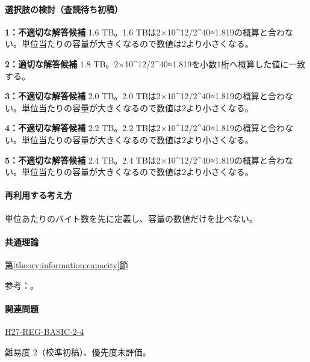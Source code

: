 \paragraph{選択肢の検討（査読待ち初稿）}\mbox{}\par

\noindent\textbf{1：不適切な解答候補} 1.6 TB。1.6 TBは2×10\textasciicircum{}12/2\textasciicircum{}40≈1.819の概算と合わない。単位当たりの容量が大きくなるので数値は2より小さくなる。\par

\noindent\textbf{2：適切な解答候補} 1.8 TB。2×10\textasciicircum{}12/2\textasciicircum{}40≈1.819を小数1桁へ概算した値に一致する。\par

\noindent\textbf{3：不適切な解答候補} 2.0 TB。2.0 TBは2×10\textasciicircum{}12/2\textasciicircum{}40≈1.819の概算と合わない。単位当たりの容量が大きくなるので数値は2より小さくなる。\par

\noindent\textbf{4：不適切な解答候補} 2.2 TB。2.2 TBは2×10\textasciicircum{}12/2\textasciicircum{}40≈1.819の概算と合わない。単位当たりの容量が大きくなるので数値は2より小さくなる。\par

\noindent\textbf{5：不適切な解答候補} 2.4 TB。2.4 TBは2×10\textasciicircum{}12/2\textasciicircum{}40≈1.819の概算と合わない。単位当たりの容量が大きくなるので数値は2より小さくなる。\par

\paragraph{再利用する考え方} 単位あたりのバイト数を先に定義し、容量の数値だけを比べない。

\paragraph{共通理論} \hyperref[theory:information:capacity]{第\ref*{theory:information:capacity}節}

\par 参考：\cite{nist_binary_prefix}。

\paragraph{関連問題} \hyperref[q:h27-reg-basic-2-4]{H27-REG-BASIC-2-4}

\par 難易度 2（校準初稿）、優先度未評価。

